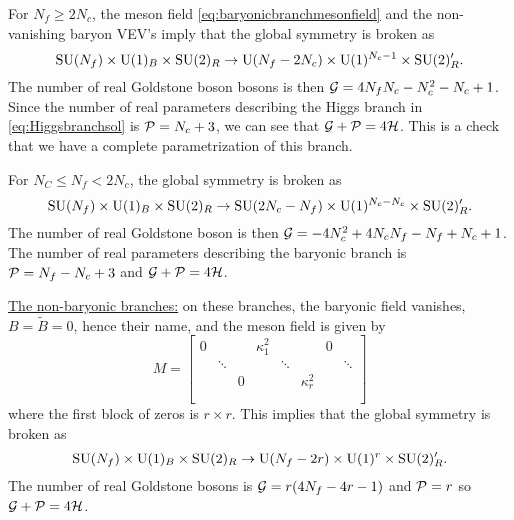            For $N_f\geq 2N_c$, the meson field \eqref{eq:baryonicbranchmesonfield} and the non-vanishing baryon VEV's imply that the global symmetry is broken as
            \begin{equation}
                \text{SU}(N_f)\times\text{U}(1)_B\times\text{SU}(2)_R\to\text{U}(N_f-2N_c)\times\text{U}(1)^{N_c-1}\times\text{SU}(2)'_R.
            \end{equation}
            The number of real Goldstone boson bosons is then $\mathcal{G}=4N_fN_c-N^2_c-N_c+1$. Since the number of real parameters describing the Higgs branch in \eqref{eq:Higgsbranchsol} is $\mathcal{P}=N_c+3$, we can see that $\mathcal{G}+\mathcal{P}=4\mathcal{H}$. This is a check that we have a complete parametrization of this branch.

            For $N_C\leq N_f< 2N_c$, the global symmetry is broken as
            \begin{equation}
                \text{SU}(N_f)\times\text{U}(1)_B\times\text{SU}(2)_R\to\text{SU}(2N_c-N_f)\times\text{U}(1)^{N_c-N_c}\times\text{SU}(2)'_R.
            \end{equation}
            The number of real Goldstone boson is then $\mathcal{G}=-4N^2_c+4N_cN_f-N_f+N_c+1$. The number of real parameters describing the baryonic branch is $\mathcal{P}=N_f-N_c+3$ and $\mathcal{G}+\mathcal{P}=4\mathcal{H}$.

            \underline{The non-baryonic branches:} on these branches, the baryonic field vanishes, $B=\tilde{B}=0$, hence their name, and the meson field is given by
            \begin{equation}
                M=
                \begin{bmatrix}
                    0 & & & \kappa^2_1 & & & 0 & \\
                    & \ddots & & & \ddots & & & \ddots \\
                    & & 0 & & & \kappa^2_r & & \\
                    & & & & & & & \\
                    & & & & & & &
                \end{bmatrix}\label{eq:nonbaryonicbranchmesonfield}
            \end{equation}
            where the first block of zeros is $r\times r$. This implies that the global symmetry is broken as
            \begin{equation}
                \text{SU}(N_f)\times\text{U}(1)_B\times\text{SU}(2)_R\to\text{U}(N_f-2r)\times\text{U}(1)^{r}\times\text{SU}(2)'_R.
            \end{equation}
            The number of real Goldstone bosons is $\mathcal{G}=r(4N_f-4r-1)$ and $\mathcal{P}=r$ so $\mathcal{G}+\mathcal{P}=4\mathcal{H}$.

